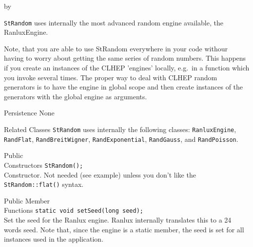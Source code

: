\documentclass[twoside]{article}
\newcommand{\entrylabel}[1]{\mbox{\textbf{{#1}}}\hfil}%
\newenvironment{entry}
{\begin{list}{}%
    {\renewcommand{\makelabel}{\entrylabel}%
     \setlength{\labelwidth}{90pt}%
     \setlength{\leftmargin}{\labelwidth}
     \advance\leftmargin by \labelsep%
      }%
    }%
  {\end{list}}
\newcommand{\Entrylabel}[1]%
{\raisebox{0pt}[1ex][0pt]{\makebox[\labelwidth][l]%
    {\parbox[t]{\labelwidth}{\hspace{0pt}\textbf{{#1}}}}}}
\newenvironment{Entry}%
{\renewcommand{\entrylabel}{\Entrylabel}\begin{entry}}%
  {\end{entry}}
\begin{document}
\begin{Entry}
    \texttt{StRandom} uses internally the most advanced random engine
    available, the RanluxEngine.
    
    Note, that you are able to use StRandom everywhere in your code
    withour having to worry about getting the same series of random
    numbers.  This happens if you create an instances of the CLHEP
    'engines' locally, e.g.~in a function which you invoke several
    times. The proper way to deal with CLHEP random generators is to
    have the engine in global scope and then create instances of the
    generators with the global engine as arguments.
    
\item[Persistence]
    None
    
\item[Related Classes]
        \texttt{StRandom} uses internally the following classes:
    \texttt{RanluxEngine}, \texttt{RandFlat},
    \texttt{RandBreitWigner}, \texttt{RandExponential},
    \texttt{RandGauss}, and \texttt{RandPoisson}.

    
\item[Public\\ Constructors]
    \verb+StRandom();+ \\
    Constructor. Not needed (see example) unless you don't
    like the \texttt{StRandom::flat()} syntax.
    
\item[Public Member\\ Functions]
    \verb+static void setSeed(long seed);+ \\
    Set the seed for the Ranlux engine. Ranlux internally
    translates this to a 24 words seed. Note that, since
    the engine is a static member, the seed is set for
    all instances used in the application.


\end{Entry}
\end{document}
